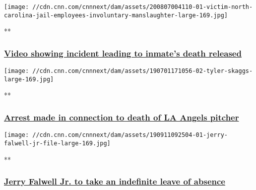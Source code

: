 \href{/videos/us/2020/08/07/nc-inmate-death-john-neville-video-released-orig-vstop-bdk.cnn/video/playlists/top-news-videos/}{}

\texttt{[image: //cdn.cnn.com/cnnnext/dam/assets/200807004110-01-victim-north-carolina-jail-employees-involuntary-manslaughter-large-169.jpg]}

**

\hypertarget{video-showing-incident-leading-to-inmates-death-released}{%
\subsubsection{\texorpdfstring{\href{/videos/us/2020/08/07/nc-inmate-death-john-neville-video-released-orig-vstop-bdk.cnn/video/playlists/top-news-videos/}{Video
showing incident leading to inmate's death
released}}{Video showing incident leading to inmate's death released}}\label{video-showing-incident-leading-to-inmates-death-released}}

\href{/videos/us/2020/08/08/arrest-in-los-angeles-angels-tyler-skraggs-death-orig-dp.cnn/video/playlists/top-news-videos/}{}

\texttt{[image: //cdn.cnn.com/cnnnext/dam/assets/190701171056-02-tyler-skaggs-large-169.jpg]}

**

\hypertarget{arrest-made-in-connection-to-death-of-la-angels-pitcher}{%
\subsubsection{\texorpdfstring{\href{/videos/us/2020/08/08/arrest-in-los-angeles-angels-tyler-skraggs-death-orig-dp.cnn/video/playlists/top-news-videos/}{Arrest
made in connection to death of LA Angels
pitcher}}{Arrest made in connection to death of LA Angels pitcher}}\label{arrest-made-in-connection-to-death-of-la-angels-pitcher}}

\href{/videos/us/2020/08/08/jerry-falwell-jr-liberty-university-indefinite-leave-absence-foreman-ctn-vpx.cnn/video/playlists/top-news-videos/}{}

\texttt{[image: //cdn.cnn.com/cnnnext/dam/assets/190911092504-01-jerry-falwell-jr-file-large-169.jpg]}

**

\hypertarget{jerry-falwell-jr-to-take-an-indefinite-leave-of-absence}{%
\subsubsection{\texorpdfstring{\href{/videos/us/2020/08/08/jerry-falwell-jr-liberty-university-indefinite-leave-absence-foreman-ctn-vpx.cnn/video/playlists/top-news-videos/}{Jerry
Falwell Jr. to take an indefinite leave of
absence}}{Jerry Falwell Jr. to take an indefinite leave of absence}}\label{jerry-falwell-jr-to-take-an-indefinite-leave-of-absence}}

